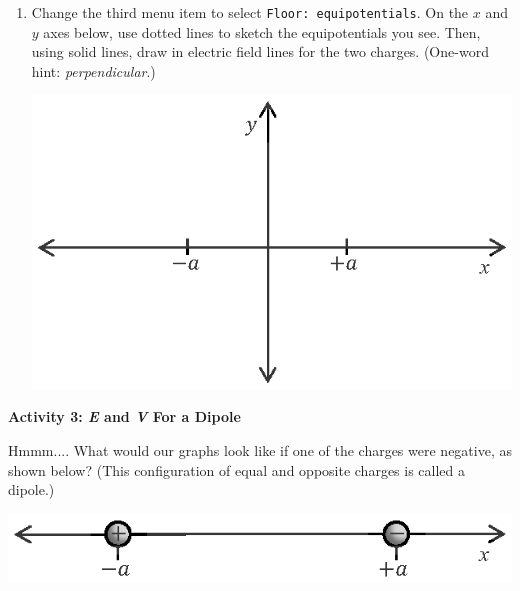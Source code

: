 \begin{enumerate}[wide, label=(\emph{\alph*})]
\item  Change the third menu item to select \verb!Floor: equipotentials!.  On the $x$ and $y$ axes below, use dotted lines to sketch the equipotentials you see.  Then, using solid lines, draw in electric field lines for the two charges.  (One-word hint: \textit{perpendicular}.)
\begin{center}
\includegraphics{potential_superposition/activity_2_3_figs/x_y_axes.eps}
\end{center}
\end{enumerate}

\pagebreak[3]
\textbf{Activity 3: \textit{E} and \textit{V} For a Dipole}

Hmmm.... What would our graphs look like if one of the charges were negative, as shown below?  (This configuration of equal and opposite charges is called a dipole.)
\begin{center}
\includegraphics{potential_superposition/activity_2_3_figs/charges_on_x_axis_dipole.eps}
\end{center}

